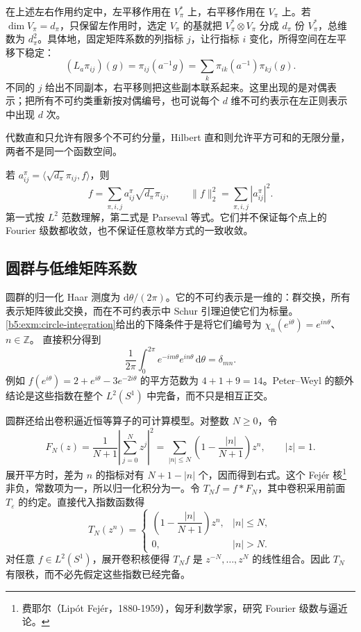 在上述左右作用约定中，左平移作用在 \(V_\pi^*\) 上，右平移作用在 \(V_\pi\) 上。若 \(\dim V_\pi=d_\pi\)，只保留左作用时，选定 \(V_\pi\) 的基就把 \(V_\pi^*\otimes V_\pi\) 分成 \(d_\pi\) 份 \(V_\pi^*\)，总维数为 \(d_\pi^2\)。具体地，固定矩阵系数的列指标 \(j\)，让行指标 \(i\) 变化，所得空间在左平移下稳定：
\[
	(L_a\pi_{ij})(g)=\pi_{ij}(a^{-1}g) =\sum_k\pi_{ik}(a^{-1})\pi_{kj}(g).
\]
不同的 \(j\) 给出不同副本，右平移则把这些副本联系起来。这里出现的是对偶表示；把所有不可约类重新按对偶编号，也可说每个 \(d\) 维不可约表示在左正则表示中出现 \(d\) 次。

\ProseParagraphBreak
代数直和只允许有限多个不可约分量，Hilbert 直和则允许平方可和的无限分量，两者不是同一个函数空间。

\ProseParagraphBreak
若 \(a^\pi_{ij}=\langle\sqrt{d_\pi}\pi_{ij},f\rangle\)，则
\[
	f=\sum_{\pi,i,j}a^\pi_{ij}\sqrt{d_\pi}\pi_{ij}, \qquad \|f\|_2^2=\sum_{\pi,i,j}|a^\pi_{ij}|^2.
\]
第一式按 \(L^2\) 范数理解，第二式是 Parseval 等式。它们并不保证每个点上的 Fourier 级数都收敛，也不保证任意枚举方式的一致收敛。

\subsection{圆群与低维矩阵系数}
\label{b5:subsec:C02:03}

圆群的归一化 Haar 测度为 \(\mathrm{d}\theta/(2\pi)\)。它的不可约表示是一维的：群交换，所有表示矩阵彼此交换，而在不可约表示中 Schur 引理迫使它们为标量。\cref{b5:exm:circle-integration}给出的下降条件于是将它们编号为 \(\chi_n(e^{i\theta})=e^{in\theta}\)、\(n\in\mathbb Z\)。 直接积分得到
\[
	\frac1{2\pi}\int_0^{2\pi}e^{-im\theta}e^{in\theta}\,\mathrm{d}\theta =\delta_{mn}.
\]
例如 \(f(e^{i\theta})=2+e^{i\theta}-3e^{-2i\theta}\) 的平方范数为 \(4+1+9=14\)。Peter--Weyl 的额外结论是这些指数在整个 \(L^2(S^1)\) 中完备，而不只是相互正交。

\ProseParagraphBreak
圆群还给出卷积逼近恒等算子的可计算模型。对整数 \(N\ge0\)，令
\[
	F_N(z)=\frac1{N+1}\left|\sum_{j=0}^Nz^j\right|^2 =\sum_{|n|\le N}\left(1-\frac{|n|}{N+1}\right)z^n, \qquad |z|=1.
\]
展开平方时，差为 \(n\) 的指标对有 \(N+1-|n|\) 个，因而得到右式。这个 Fej\'er 核\footnote{费耶尔（Lip\'ot Fej\'er，1880-1959），匈牙利数学家，研究 Fourier 级数与逼近论。}非负，常数项为一，所以归一化积分为一。令 \(T_Nf=f*F_N\)，其中卷积采用前面 \(T_\varepsilon\) 的约定。直接代入指数函数得
\[
	T_N(z^n)=
	\begin{cases}
		\left(1-\dfrac{|n|}{N+1}\right)z^n,&|n|\le N,\\
		0,&|n|>N.
	\end{cases}
\]
对任意 \(f\in L^2(S^1)\)，展开卷积核便得 \(T_Nf\) 是 \(z^{-N},\ldots,z^N\) 的线性组合。因此 \(T_N\) 有限秩，而不必先假定这些指数已经完备。

